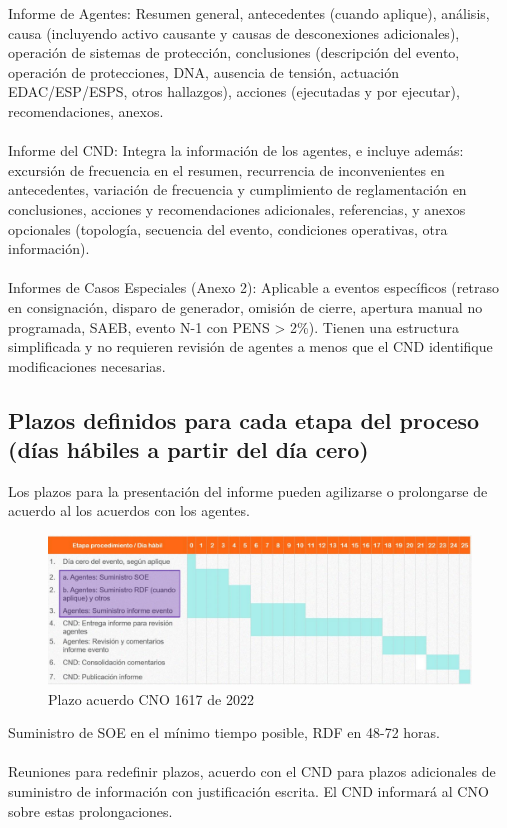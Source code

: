 \documentclass[a5paper]{book}%
\begin{document}
    Informe de Agentes: Resumen general, antecedentes (cuando aplique), análisis, causa (incluyendo activo causante y causas de desconexiones adicionales), operación de sistemas de protección, conclusiones (descripción del evento, operación de protecciones, DNA, ausencia de tensión, actuación EDAC/ESP/ESPS, otros hallazgos), acciones (ejecutadas y por ejecutar), recomendaciones, anexos.\\\\
    Informe del CND: Integra la información de los agentes, e incluye además: excursión de frecuencia en el resumen, recurrencia de inconvenientes en antecedentes, variación de frecuencia y cumplimiento de reglamentación en conclusiones, acciones y recomendaciones adicionales, referencias, y anexos opcionales (topología, secuencia del evento, condiciones operativas, otra información).\\\\
    Informes de Casos Especiales (Anexo 2): Aplicable a eventos específicos (retraso en consignación, disparo de generador, omisión de cierre, apertura manual no programada, SAEB, evento N-1 con PENS > 2\%). Tienen una estructura simplificada y no requieren revisión de agentes a menos que el CND identifique modificaciones necesarias.

\subsection{Plazos definidos para cada etapa del proceso (días hábiles a partir del día cero)}

Los plazos para la presentación del informe pueden agilizarse o prolongarse de acuerdo al los acuerdos con los agentes.

\begin{figure}[H]
  \caption{Plazo acuerdo CNO 1617 de 2022}
  \label{fig:plazo1617}
  \includegraphics[width=\linewidth]{plazo16172022}
 \end{figure}

Suministro de SOE en el mínimo tiempo posible, RDF en 48-72 horas.\\\\
Reuniones para redefinir plazos, acuerdo con el CND para plazos adicionales de suministro de información con justificación escrita. El CND informará al CNO sobre estas prolongaciones.
\end{document}
